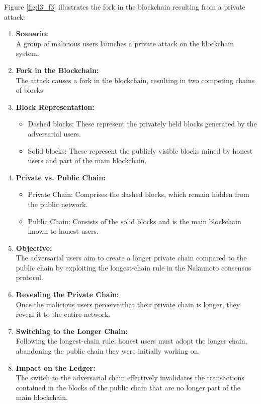 Figure \ref{fig:l3_f3} illustrates the fork in the blockchain resulting from a private attack:
\begin{enumerate}
	\item \textbf{Scenario:} \\A group of malicious users launches a private attack on the blockchain system.
	\item \textbf{Fork in the Blockchain:} \\The attack causes a fork in the blockchain, resulting in two competing chains of blocks.
	\item \textbf{Block Representation:} 
	\begin{itemize}
		\item Dashed blocks: These represent the privately held blocks generated by the adversarial users.
		\item Solid blocks: These represent the publicly visible blocks mined by honest users and part of the main blockchain.
	\end{itemize}
	\item \textbf{Private vs. Public Chain:}
	\begin{itemize}
		\item Private Chain: Comprises the dashed blocks, which remain hidden from the public network.
		\item Public Chain: Consists of the solid blocks and is the main blockchain known to honest users.
	\end{itemize}
	\item \textbf{Objective:} \\The adversarial users aim to create a longer private chain compared to the public chain by exploiting the longest-chain rule in the Nakamoto consensus protocol.
	\item \textbf{Revealing the Private Chain:}\\Once the malicious users perceive that their private chain is longer, they reveal it to the entire network.
	\item \textbf{Switching to the Longer Chain:} \\Following the longest-chain rule, honest users must adopt the longer chain, abandoning the public chain they were initially working on.
	\item \textbf{Impact on the Ledger:}\\The switch to the adversarial chain effectively invalidates the transactions contained in the blocks of the public chain that are no longer part of the main blockchain.
\end{enumerate}
